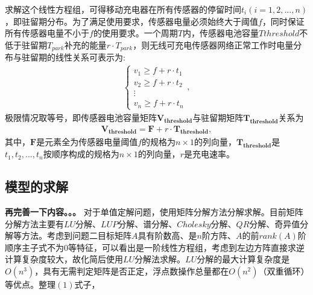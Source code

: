 \documentclass{whutmod}
\begin{document}
			求解这个线性方程组，可得移动充电器在所有传感器的停留时间$t_i(i=1,2,...,n)$，即驻留期分布。为了满足使用要求，传感器电量必须始终大于阈值$f$，同时保证所有传感器电量不小于$f$的使用要求。一个周期$T$内，传感器电池容量$T{threshold}$不低于驻留期$T_{park}$补充的能量$r \cdot T_{park}$，则无线可充电传感器网络正常工作时电量分布与驻留期的线性关系可表示为:
			\begin{gather}
			\left\{\begin{matrix}
			v_1\geq f+r\cdot t_1\\ 
			v_2\geq f+r\cdot t_2\\ 
			\vdots \\ 
			v_n \geq f+r\cdot t_n
			\end{matrix}\right.,
			\end{gather}
			极限情况取等号，即传感器电池容量矩阵$\bm {V_{threshold}}$与驻留期矩阵$\bm {T_{threshold}}$关系为
			\begin{gather}
			\bm{V_{threshold}}=\bm{F}+r\cdot \bm{T_{threshold}},
			\end{gather}
			其中，$\bm F$是元素全为传感器电量阈值$f$的规格为$n \times 1$的列向量，$\bm{T_{threshold}}$是$t_1,t_2,...,t_{n}$按顺序构成的规格为$n\times 1$的列向量，$r$是充电速率。
    		
    		

		
		
		\subsection{模型的求解}
		\textbf{再完善一下内容。。。}
		对于单值定解问题，使用矩阵分解方法分解求解。目前矩阵分解方法主要有$LU$分解、$LUP$分解、谱分解、$Cholesky$分解、$QR$分解、奇异值分解等方法。考虑到问题二目标矩阵$A$具有阶数高、是$n$阶方阵、$A$的前$rank(A)$阶顺序主子式不为$0$等特征，可以看出是一阶线性方程组，考虑到左边方阵直接求逆计算复杂度较大，故化简后使用$LU$分解法求解。$LU$分解的最大计算复杂度是$O(n^3)$，具有无需判定矩阵是否正定，浮点数操作总量都在$O(n^2)$（双重循环）等优点。整理$(1)$式子，
		
\end{document}
